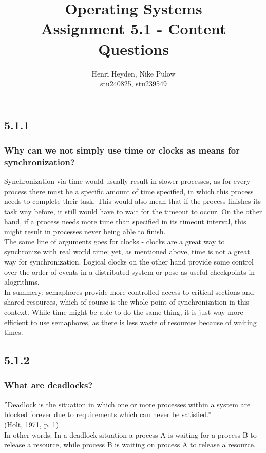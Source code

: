 \documentclass[12pt, a4paper]{article}
\title{Operating Systems\\Assignment 5.1 - Content Questions}
\author{Henri Heyden, Nike Pulow \\ \small stu240825, stu239549}
\date{}
\begin{document}
\maketitle

\singlespacing
\vspace*{-2cm}
\subsection*{5.1.1}
\subsubsection*{Why can we not simply use time or clocks as means for synchronization?}
Synchronization via time would usually result in slower processes, as for every process there must 
be a specific amount of time specified, in which this process needs to complete their task. This would 
also mean that if the process finishes its task way before, it still would have to wait for the timeout 
to occur. On the other hand, if a process needs more time than specified in its timeout interval, this 
might result in processes never being able to finish. \\
The same line of arguments goes for clocks - clocks are a great way to synchronize with real world time; 
yet, as mentioned above, time is not a great way for synchronization. Logical clocks on the other hand provide 
some control over the order of events in a distributed system or pose as useful checkpoints in alogrithms. \\
In summery: semaphores provide more controlled access to critical sections and shared resources, which of 
course is the whole point of synchronization in this context. While time might be able to do the same thing, 
it is just way more efficient to use semaphores, as there is less waste of resources because of waiting times.

\subsection*{5.1.2}
\subsubsection*{What are deadlocks?}
''Deadlock is the situation in which one or more processes within a system are blocked forever due to 
requirements which can never be satisfied.'' \\(Holt, 1971, p. 1)\\ In other words: In a deadlock situation 
a process A is waiting for a process B to release a resource, while process B is waiting on process A to 
release a resource.\\
\end{document}
